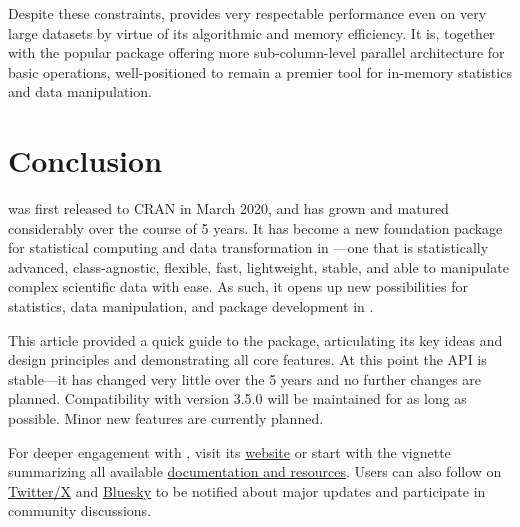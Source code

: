 \documentclass[nojss]{jss} %
\begin{document}
Despite these constraints,  provides very respectable performance even on very large datasets by virtue of its algorithmic and memory efficiency. It is, together with the popular  package offering more sub-column-level parallel architecture for basic operations, well-positioned to remain a premier tool for in-memory statistics and data manipulation. %


\section{Conclusion} \label{sec:conclusion}

 was first released to CRAN in March 2020, and has grown and matured considerably over the course of 5 years. It has become a new foundation package for statistical computing and data transformation in ---one that is statistically advanced, class-agnostic, flexible, fast, lightweight, stable, and able to manipulate complex scientific data with ease. As such, it opens up new possibilities for statistics, data manipulation, and package development in . \newline %

This article provided a quick guide to the package, articulating its key ideas and design principles and demonstrating all core features. At this point the API is stable---it has changed very little over the 5 years and no further changes are planned. Compatibility with  version 3.5.0 will be maintained for as long as possible. Minor new features are currently planned. \newline

For deeper engagement with , visit its \href{https://sebkrantz.github.io/collapse/index.html}{website} or start with the vignette summarizing all available \href{https://sebkrantz.github.io/collapse/articles/collapse_documentation.html}{documentation and resources}. Users can also follow  on \href{https://x.com/collapse_R}{Twitter/X} and \href{https://bsky.app/profile/rcollapse.bsky.social}{Bluesky} to be notified about major updates and participate in community discussions. \newline
\end{document}
